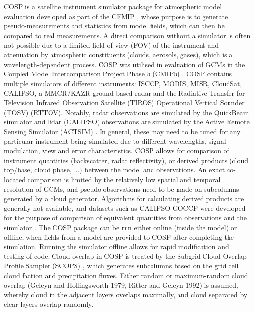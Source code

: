 COSP \citep{bodas-salcedo2011} is a satellite instrument simulator package
for atmospheric model evaluation developed as part of
the CFMIP \citep{bony2011},
whose purpose is to generate pseudo-measurements and statistics from model fields, which can
then be compared to real
measurements. A direct comparison without a simulator is often not possible
due to a limited field of view (FOV) of the instrument and attenuation by atmospheric
constituents (clouds, aerosols, gases), which is a wavelength-dependent process.
COSP was utilised in evaluation of GCMs in the
Coupled Model Intercomparison Project Phase 5 (CMIP5) \citep{taylor2011}.
COSP contains multiple simulators of different instruments:
ISCCP, MODIS, MISR, CloudSat, CALIPSO, a MMCR/KAZR ground-based radar
and the Radiative Transfer for Television Infrared Observation Satellite (TIROS)
Operational Vertical Sounder (TOSV) (RTTOV).
Notably, radar observations are simulated by the QuickBeam simulator
\citep{haynes2007} and lidar (CALIPSO) observations are simulated
by the Active Remote Sensing Simulator (ACTSIM) \citep{chepfer2008}. In general, these may need
to be tuned for any particular instrument being simulated due to different
wavelengths, signal modulation, view and error characteristics.
COSP allows for comparison of instrument quantities
(backscatter, radar reflectivity), or derived products
(cloud top/base, cloud phase, ...) between the model and observations.
An exact co-located comparison is limited by the relatively low spatial and
temporal resolution
of GCMs, and pseudo-observations need to be made on subcolumns generated by
a cloud generator. Algorithms for calculating derived products are generally not
available, and datasets such as CALIPSO-GOCCP were developed for the purpose
of comparison of equivalent quantities from observations and the simulator
\citep{chepfer2010}.
The COSP package can be run either online (inside the model) or offline,
when fields from a model are provided to COSP after completing the simulation.
Running the simulator offline allows for rapid modification
and testing of code. Cloud overlap in COSP is treated by the Subgrid Cloud Overlap Profile Sampler
(SCOPS) \citep{webb2001}, which generates subcolumns based on the grid cell
cloud faction and precipitation fluxes. Either random or maximum-random cloud overlap
(Geleyn and Hollingsworth 1979, Ritter and Geleyn 1992) is assumed,
whereby cloud in the adjacent layers overlaps maximally, and cloud separated
by clear layers overlap randomly.

